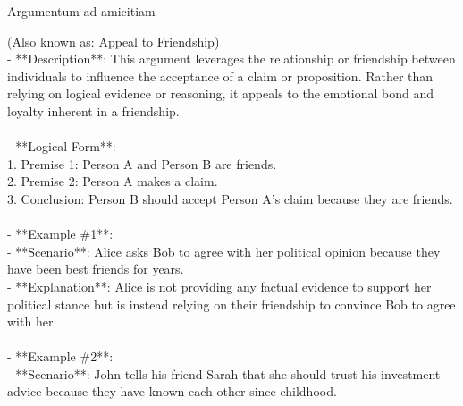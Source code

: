 \documentclass[a4paper,12pt,single,pdftex]{scrartcl}
\begin{document}
  

Argumentum ad amicitiam
    
      (Also known as:  Appeal to Friendship)
    \\

  
    
      - **Description**: This argument leverages the relationship or friendship between individuals to influence the acceptance of a claim or proposition. Rather than relying on logical evidence or reasoning, it appeals to the emotional bond and loyalty inherent in a friendship.
    \\

    
      
    \\

    
      - **Logical Form**:
    \\

    
        1. Premise 1: Person A and Person B are friends.
    \\

    
        2. Premise 2: Person A makes a claim.
    \\

    
        3. Conclusion: Person B should accept Person A's claim because they are friends.
    \\

    
      
    \\

    
      - **Example \#1**:
    \\

    
        - **Scenario**: Alice asks Bob to agree with her political opinion because they have been best friends for years.
    \\

    
        - **Explanation**: Alice is not providing any factual evidence to support her political stance but is instead relying on their friendship to convince Bob to agree with her.
    \\

    
      
    \\

    
      - **Example \#2**:
    \\

    
        - **Scenario**: John tells his friend Sarah that she should trust his investment advice because they have known each other since childhood.
    \\
\end{document}
